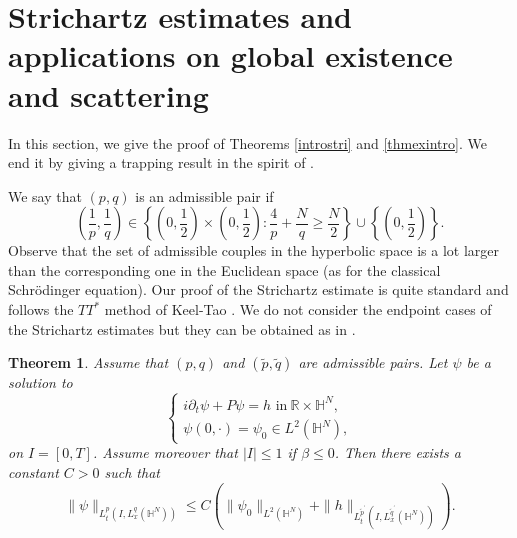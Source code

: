 \documentclass[10pt,leqno]{amsart}
\newtheorem{thm}{Theorem}[section]
\numberwithin{equation}{section}
\newcommand{\field}[1]{\mathbb{#1}}
\newcommand{\R}{\field{R}}          		%
\newcommand{\Hy}{\field{H}}
\begin{document}
\section{Strichartz estimates and applications on global existence and scattering}\label{secstri}
In this section, we give the proof of Theorems \ref{introstri} and \ref{thmexintro}. We end it by giving a trapping result in the spirit of \cite{MR3338838}. 




We say that $(p,q)$ is an admissible pair if %
$$\left(\frac{1}{p},\frac{1}{q}\right)\in  \left\lbrace\left(0,\frac{1}{2} \right)\times \left(0,\frac{1}{2}\right) \colon \frac{4}{p} +\frac{N}{q} \geq \frac{N}{2} \right\rbrace \cup \left\lbrace\left(0,\frac{1}{2}\right) \right\rbrace.$$
Observe that the set of admissible couples in the hyperbolic space is a lot larger than the corresponding one in the Euclidean space (as for the classical Schr\" odinger equation). Our proof of the Strichartz estimate is quite standard and follows the $TT^\ast$ method of Keel-Tao \cite{keel-tao}.
We do not consider the endpoint cases of the Strichartz estimates but they can be obtained as in \cite{keel-tao}.  




\begin{thm}
\label{thmstri} %
Assume that $(p,q)$ and $(\tilde{p},\tilde{q})$ are admissible pairs. Let $\psi$ be a solution to
$$\begin{cases} i\partial_t \psi +P \psi=h\mbox{ in}\ \R\times \Hy^N ,\\ \psi(0,\cdot)=\psi_0 \in L^2 (\Hy^N),\end{cases}$$
on $I=[0,T]$. Assume moreover that $|I|\leq 1$ if $\beta\leq 0$. Then there exists a constant $C>0$ such that
\begin{equation}
\label{stri}
\|\psi\|_{L_t^p (I, L_x^q (\Hy^N))}\leq C (\|\psi_0\|_{L^2(\Hy^N)} +\|h\|_{L_t^{\tilde{p}^\prime } (I,L_x^{\tilde{q}^\prime} (\Hy^N))}).
\end{equation}

\end{thm}
\end{document}
